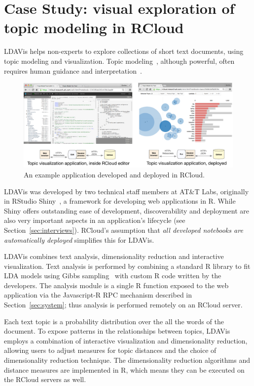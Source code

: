 \section{Case Study\label{sec:casestudy}: visual exploration of topic modeling in RCloud}

LDAVis helps non-experts to explore collections of
short text documents, using topic modeling and
visualization. Topic modeling~\cite{Blei:2003:LDA},
although powerful, often requires human guidance
and interpretation~\cite{Sievert:2014:LAM}.

\begin{figure}
  \includegraphics[width=\linewidth]{fig/casestudytext/casestudytext.pdf}
  \caption{\label{fig:textvis}An example application developed and deployed in RCloud.}
\end{figure}

LDAVis was developed by two technical staff members at
AT\&T Labs, originally in RStudio Shiny~\cite{RStudio:2013:SWA},
a framework for developing web applications in R.
While Shiny offers outstanding ease of development,
discoverability and deployment are also very important aspects
in an application's lifecycle (see Section~\ref{sec:interviews}).
RCloud's assumption that \emph{all developed notebooks are automatically
deployed} simplifies this for LDAVis.

LDAVis combines text analysis, dimensionality reduction and
interactive visualization. Text analysis is performed by
combining a standard R library to fit LDA models using
Gibbs sampling~\cite{} with custom R code written by the
developers. The analysis module is a single R function
exposed to the web application via the Javascript-R RPC
mechanism described in Section~\ref{sec:system};
thus analysis is performed remotely on an RCloud server.

Each text topic is a probability distribution over the all the
words of the document. To expose patterns in the relationships
between topics, LDAVis employs a combination of
interactive visualization and dimensionality reduction,
allowing users to adjust measures for topic distances and the choice
of dimensionality reduction technique. The dimensionality reduction
algorithms and distance measures are implemented in R, which
means they can be executed on the RCloud servers as well.

